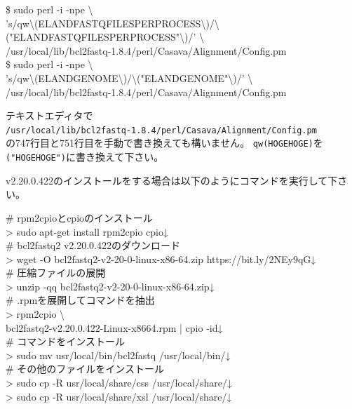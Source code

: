 \documentclass[titlepage,10pt,a4paper]{jsbook}
\newenvironment{cmd}{\begin{oframed}\raggedright\ttfamily\footnotesize\setlength{\baselineskip}{1.4em}}{\end{oframed}\vspace{-1em}}
\begin{document}
\begin{cmd}
\$ sudo perl -i -npe {\textbackslash}\\
's/qw{\textbackslash}(ELAND{\textunderscore}FASTQ{\textunderscore}FILES{\textunderscore}PER{\textunderscore}PROCESS{\textbackslash})/{\textbackslash}("ELAND{\textunderscore}FASTQ{\textunderscore}FILES{\textunderscore}PER{\textunderscore}PROCESS"{\textbackslash})/' {\textbackslash}\\
/usr/local/lib/bcl2fastq-1.8.4/perl/Casava/Alignment/Config.pm\\
\$ sudo perl -i -npe {\textbackslash}\\
's/qw{\textbackslash}(ELAND{\textunderscore}GENOME{\textbackslash})/{\textbackslash}("ELAND{\textunderscore}GENOME"{\textbackslash})/' {\textbackslash}\\
/usr/local/lib/bcl2fastq-1.8.4/perl/Casava/Alignment/Config.pm
\end{cmd}

テキストエディタで\\
\texttt{/usr/local/lib/bcl2fastq-1.8.4/perl/Casava/Alignment/Config.pm}\\
の747行目と751行目を手動で書き換えても構いません。
\texttt{qw(HOGEHOGE)}を\texttt{("HOGEHOGE")}に書き換えて下さい。

v2.20.0.422のインストールをする場合は以下のようにコマンドを実行して下さい。

\begin{cmd}
\# rpm2cpioとcpioのインストール\\
{\textgreater} sudo apt-get install rpm2cpio cpio↓\\
\# bcl2fastq2 v2.20.0.422のダウンロード\\
{\textgreater} wget -O bcl2fastq2-v2-20-0-linux-x86-64.zip https://bit.ly/2NEy9qG↓\\
\# 圧縮ファイルの展開\\
{\textgreater} unzip -qq bcl2fastq2-v2-20-0-linux-x86-64.zip↓\\
\# .rpmを展開してコマンドを抽出\\
{\textgreater} rpm2cpio {\textbackslash}\\
bcl2fastq2-v2.20.0.422-Linux-x86{\textunderscore}64.rpm | cpio -id↓\\
\# コマンドをインストール\\
{\textgreater} sudo mv usr/local/bin/bcl2fastq /usr/local/bin/↓\\
\# その他のファイルをインストール\\
{\textgreater} sudo cp -R usr/local/share/css /usr/local/share/↓\\
{\textgreater} sudo cp -R usr/local/share/xsl /usr/local/share/↓
\end{cmd}
\end{document}
